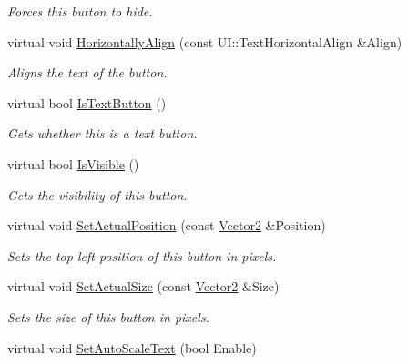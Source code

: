 \begin{DoxyCompactItemize}
\begin{DoxyCompactList}\small\item\em Forces this button to hide. \item\end{DoxyCompactList}\item 
virtual void \hyperlink{classphys_1_1UI_1_1TextButton_ae64641f1a7c54e869a44adbe6b0d9c0a}{HorizontallyAlign} (const UI::TextHorizontalAlign \&Align)
\begin{DoxyCompactList}\small\item\em Aligns the text of the button. \item\end{DoxyCompactList}\item 
virtual bool \hyperlink{classphys_1_1UI_1_1TextButton_ad3d493189347077db92e609e47f837f5}{IsTextButton} ()
\begin{DoxyCompactList}\small\item\em Gets whether this is a text button. \item\end{DoxyCompactList}\item 
virtual bool \hyperlink{classphys_1_1UI_1_1TextButton_a505167a00d343d704df1f759cd12ed1e}{IsVisible} ()
\begin{DoxyCompactList}\small\item\em Gets the visibility of this button. \item\end{DoxyCompactList}\item 
virtual void \hyperlink{classphys_1_1UI_1_1TextButton_aa82c174bba5db127a5a9977b9fdf1384}{SetActualPosition} (const \hyperlink{classphys_1_1Vector2}{Vector2} \&Position)
\begin{DoxyCompactList}\small\item\em Sets the top left position of this button in pixels. \item\end{DoxyCompactList}\item 
virtual void \hyperlink{classphys_1_1UI_1_1TextButton_a768d203a323cca2054fa355c25fab9ef}{SetActualSize} (const \hyperlink{classphys_1_1Vector2}{Vector2} \&Size)
\begin{DoxyCompactList}\small\item\em Sets the size of this button in pixels. \item\end{DoxyCompactList}\item 
virtual void \hyperlink{classphys_1_1UI_1_1TextButton_afa1fd7dea37485b0b364328e62154a4f}{SetAutoScaleText} (bool Enable)

\end{DoxyCompactItemize}

